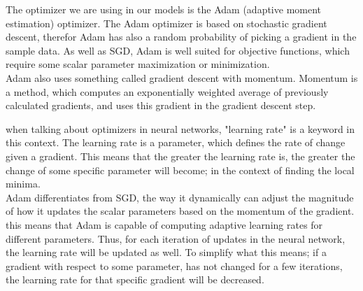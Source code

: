The optimizer we are using in our models is the Adam (adaptive moment estimation)  optimizer. The Adam optimizer is based on stochastic gradient descent\cite{adam}, therefor Adam has also a random probability of picking a gradient in the sample data. As well as SGD, Adam is well suited for objective functions, which require some scalar parameter maximization or minimization. \\

\noindent
Adam also uses something called gradient descent with momentum. Momentum is a method, which computes an exponentially weighted average of previously calculated gradients, and uses this gradient in the gradient descent step.

\noindent
when talking about optimizers in neural networks, "learning rate" is a keyword in this context. The learning rate is a parameter, which defines the rate of change given a gradient. This means that the greater the learning rate is, the greater the change of some specific parameter will become; in the context of finding the local minima.\\

\noindent
Adam differentiates from SGD, the way it dynamically can adjust the magnitude of how it updates the scalar parameters based on the momentum of the gradient. this means that Adam is capable of computing adaptive learning rates for different parameters\cite{adam}. Thus, for each iteration of updates in the neural network, the learning rate will be updated as well. To simplify what this means; if a gradient with respect to some parameter, has not changed for a few iterations, the learning rate for that specific gradient will be decreased.
